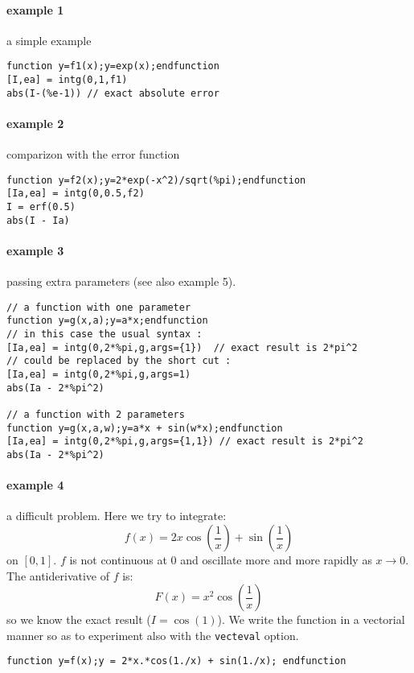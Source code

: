 \begin{examples}
  
\paragraph{example 1} a simple example 
\begin{Verbatim}
function y=f1(x);y=exp(x);endfunction
[I,ea] = intg(0,1,f1)
abs(I-(%e-1)) // exact absolute error
\end{Verbatim}
  
\paragraph{example 2} comparizon with the error function
\begin{Verbatim}
function y=f2(x);y=2*exp(-x^2)/sqrt(%pi);endfunction
[Ia,ea] = intg(0,0.5,f2)
I = erf(0.5)
abs(I - Ia)
\end{Verbatim}
  
\paragraph{example 3} passing extra parameters (see also example 5). 
\begin{Verbatim}
// a function with one parameter
function y=g(x,a);y=a*x;endfunction
// in this case the usual syntax :
[Ia,ea] = intg(0,2*%pi,g,args={1})  // exact result is 2*pi^2
// could be replaced by the short cut :
[Ia,ea] = intg(0,2*%pi,g,args=1)
abs(Ia - 2*%pi^2)

// a function with 2 parameters
function y=g(x,a,w);y=a*x + sin(w*x);endfunction
[Ia,ea] = intg(0,2*%pi,g,args={1,1}) // exact result is 2*pi^2
abs(Ia - 2*%pi^2)
\end{Verbatim}

\paragraph{example 4} a difficult problem. Here we try to integrate:
$$
    f(x) = 2 x \cos \left(\frac{1}{x}\right) +  \sin \left(\frac{1}{x}\right)
$$ 
on $[0,1]$. $f$ is not continuous at $0$ and oscillate more and more
rapidly as $x \rightarrow 0$. The antiderivative of $f$
is:
$$
    F(x) = x^2  \cos \left(\frac{1}{x}\right)
$$
so we know the exact result ($I=\cos(1)$). We write the function in a vectorial
manner so as to experiment also with the \verb+vecteval+ option. 
\begin{Verbatim}
function y=f(x);y = 2*x.*cos(1./x) + sin(1./x); endfunction


\end{Verbatim}
\end{examples}
